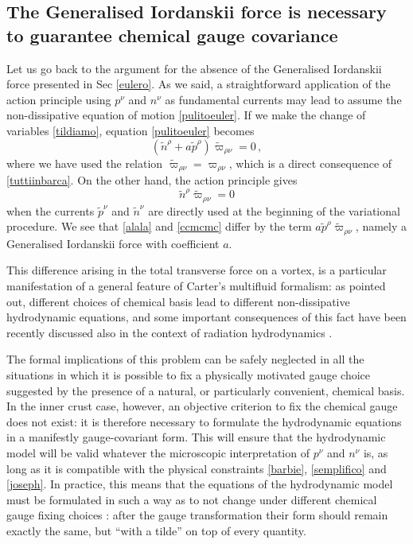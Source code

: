 \documentclass[preprints,article,accept,moreauthors,pdftex]{mdpi}
\begin{document}
\subsection{The Generalised Iordanskii force is necessary to guarantee chemical gauge covariance}\label{ZZZZZaZZZu}

Let us go back to the argument for the absence of the Generalised Iordanskii force  presented in Sec \ref{eulero}. As we said, a straightforward application of the action principle using $p^\nu$ and $n^\nu$ as fundamental currents may lead to assume the non-dissipative equation of motion \eqref{pulitoeuler}. If we make the change of variables \eqref{tildiamo}, equation \eqref{pulitoeuler} becomes
\begin{equation}\label{alala}
( \tilde{n}^\rho + a \tilde{p}^\rho ) \tilde{\varpi}_{\rho \nu}=0 \, ,
\end{equation}
where we have used the relation $\tilde{\varpi}_{\rho \nu } = \varpi_{\rho \nu }$,
which is a direct consequence of \eqref{tuttiinbarca}.
On the other hand, the action principle gives 
\begin{equation}\label{ccmcmc}
\tilde{n}^\rho \tilde{\varpi}_{\rho \nu }=0  
\end{equation}
when the currents  $\tilde{p}^\nu$ and $\tilde{n}^\nu$ are directly used at the beginning of the variational procedure.
We see that \eqref{alala} and \eqref{ccmcmc} differ by the term $a \tilde{p}^\rho \tilde{\varpi}_{\rho \nu }$, namely a Generalised Iordanskii force with coefficient $a$. 

This difference arising in the total transverse force on a vortex, is a particular manifestation of a general feature of Carter's multifluid formalism: as \citet{Carter_Starting_Point} pointed out, different choices of chemical basis lead to different non-dissipative hydrodynamic equations, and some important consequences of this fact have been recently discussed also in the context of radiation hydrodynamics \cite{GavassinoRadiazione}.  


The formal  implications of this problem can be safely neglected in all the situations in which it is possible to fix a physically motivated gauge choice suggested by the presence of a natural, or particularly convenient, chemical basis. 
In the inner crust case, however, an objective criterion to fix the chemical gauge does not exist: it is therefore  necessary to formulate the hydrodynamic equations in a manifestly gauge-covariant form. This will ensure that the hydrodynamic  model will be valid whatever the microscopic interpretation of $p^\nu$ and $n^\nu$ is, as long as it is compatible with the physical constraints \eqref{barbie}, \eqref{semplifico} and \eqref{joseph}. 
In practice, this means that the equations of the hydrodynamic model must be formulated in such a way as to not change under different chemical gauge fixing choices \cite{Termo}: after the gauge transformation their form should remain exactly the same, but ``with a tilde'' on top of every quantity.
\end{document}
